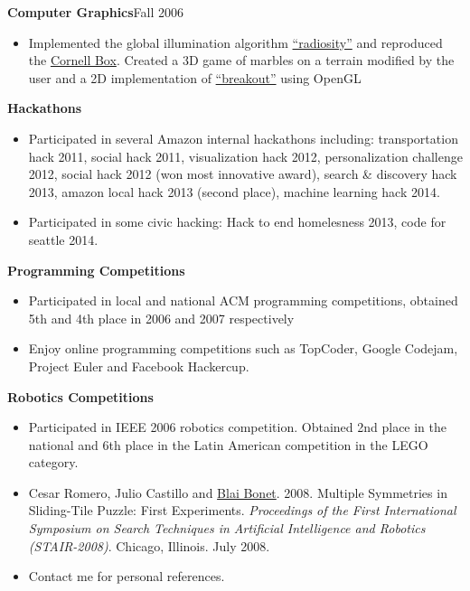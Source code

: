 \documentclass[10pt]{article}
\newcommand{\vitem}{\vspace*{-.4pc}\item}
\begin{document}

\textbf{Computer Graphics}\hfill Fall 2006
\begin{itemize}
 \vitem Implemented the global illumination algorithm
  \href{http://en.wikipedia.org/wiki/Radiosity_\%283D_computer_graphics\%29}{``radiosity''}
  and reproduced the
  \href{http://en.wikipedia.org/wiki/Cornell_box}{Cornell Box}.
  Created a 3D game of marbles on a terrain modified by the user and a
  2D implementation of
  \href{http://en.wikipedia.org/wiki/Breakout_\%28arcade_game\%29}{``breakout''}
  using OpenGL
\end{itemize}

\flushleft{}\textbf{Hackathons}
\begin{itemize}
\vitem Participated in several Amazon internal hackathons including:
transportation hack 2011, social hack 2011, visualization hack 2012,
personalization challenge 2012, social hack 2012 (won most innovative
award), search \& discovery hack 2013, amazon local hack 2013 (second
place), machine learning hack 2014.
\vitem Participated in some civic hacking: Hack to end homelesness 2013,
code for seattle 2014.
\end{itemize}

\flushleft{}\textbf{Programming Competitions}
\begin{itemize}
\vitem Participated in local and national ACM programming competitions, obtained 5th and 4th place in 2006 and 2007 respectively
\vitem Enjoy online programming competitions such as TopCoder, Google
Codejam, Project Euler and Facebook Hackercup.
\end{itemize}

\textbf{Robotics Competitions}
\begin{itemize}
\vitem Participated in IEEE 2006 robotics competition. Obtained 2nd place in the national and 6th place in the Latin American competition in the LEGO category.
\end{itemize}

\begin{itemize}
\vitem Cesar Romero, Julio Castillo and
\href{http://www.ldc.usb.ve/~bonet}{Blai Bonet}. 2008. Multiple
Symmetries in Sliding-Tile Puzzle: First Experiments. \emph{Proceedings of the First International Symposium on Search Techniques in Artificial Intelligence and Robotics (STAIR-2008)}. Chicago, Illinois. July 2008.
\end{itemize}

\begin{itemize}
\vitem Contact me for personal references.
\end{itemize}
\end{document}
